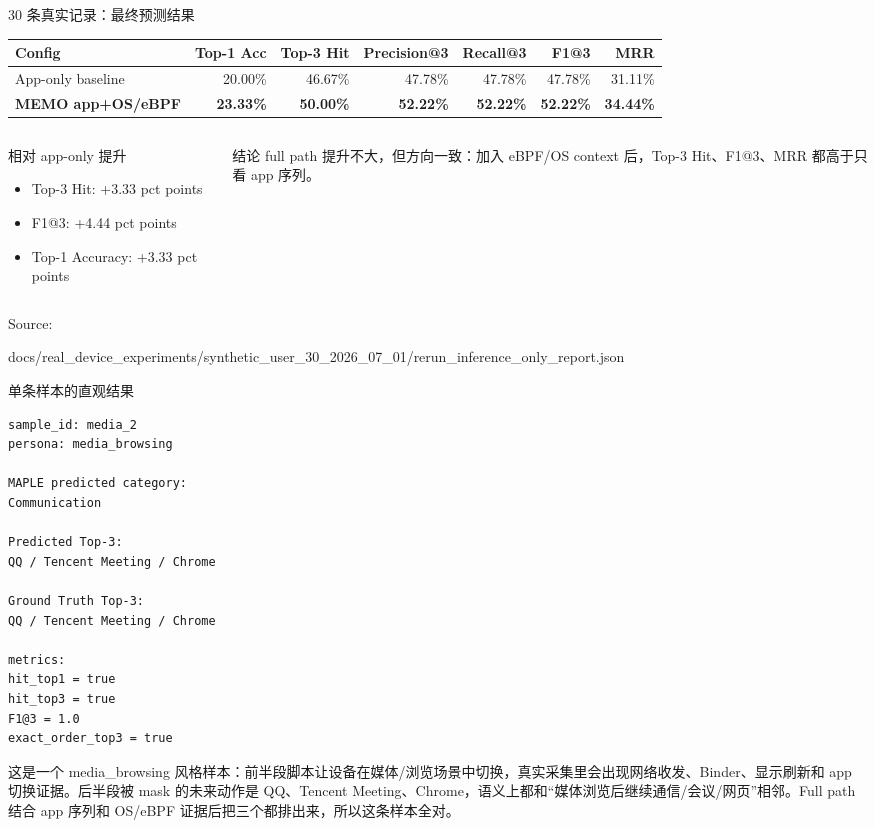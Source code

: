 \documentclass[UTF8,aspectratio=169,10pt]{ctexbeamer}
\newcommand{\sourcefoot}[1]{%
  \vfill
  {\scriptsize\textcolor{memoGray}{Source: }%
  \parbox[t]{0.84\textwidth}{\raggedright\ttfamily\scriptsize #1}}%
}
\newcommand{\explainfoot}[1]{%
  \vspace{0.35em}
  {\scriptsize\color{memoGray}#1}
}
\begin{document}
\begin{frame}{30 条真实记录：最终预测结果}
  \scriptsize
  \begin{tabular}{lrrrrrr}
    \toprule
    Config & Top-1 Acc & Top-3 Hit & Precision@3 & Recall@3 & F1@3 & MRR \\
    \midrule
    App-only baseline & 20.00\% & 46.67\% & 47.78\% & 47.78\% & 47.78\% & 31.11\% \\
    \textbf{MEMO app+OS/eBPF} & \textbf{23.33\%} & \textbf{50.00\%} & \textbf{52.22\%} & \textbf{52.22\%} & \textbf{52.22\%} & \textbf{34.44\%} \\
    \bottomrule
  \end{tabular}
  \vspace{0.8em}
  \begin{columns}[T,totalwidth=\textwidth]
    \begin{column}{0.48\textwidth}
      \begin{block}{相对 app-only 提升}
        \begin{itemize}
          \item Top-3 Hit: +3.33 pct points
          \item F1@3: +4.44 pct points
          \item Top-1 Accuracy: +3.33 pct points
        \end{itemize}
      \end{block}
    \end{column}
    \begin{column}{0.48\textwidth}
      \begin{block}{结论}
        full path 提升不大，但方向一致：加入 eBPF/OS context 后，Top-3 Hit、F1@3、MRR 都高于只看 app 序列。
      \end{block}
    \end{column}
  \end{columns}
  \sourcefoot{docs/real\_device\_experiments/synthetic\_user\_30\_2026\_07\_01/rerun\_inference\_only\_report.json}
\end{frame}

\begin{frame}[fragile]{单条样本的直观结果}
\begin{lstlisting}
sample_id: media_2
persona: media_browsing

MAPLE predicted category:
Communication

Predicted Top-3:
QQ / Tencent Meeting / Chrome

Ground Truth Top-3:
QQ / Tencent Meeting / Chrome

metrics:
hit_top1 = true
hit_top3 = true
F1@3 = 1.0
exact_order_top3 = true
\end{lstlisting}
  \explainfoot{这是一个 media\_browsing 风格样本：前半段脚本让设备在媒体/浏览场景中切换，真实采集里会出现网络收发、Binder、显示刷新和 app 切换证据。后半段被 mask 的未来动作是 QQ、Tencent Meeting、Chrome，语义上都和“媒体浏览后继续通信/会议/网页”相邻。Full path 结合 app 序列和 OS/eBPF 证据后把三个都排出来，所以这条样本全对。}
\end{frame}
\end{document}
